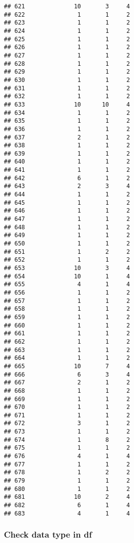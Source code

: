 \documentclass[
]{article}
\begin{document}
\begin{verbatim}
## 621              10       3     4
## 622               1       1     2
## 623               1       1     2
## 624               1       1     2
## 625               1       1     2
## 626               1       1     2
## 627               1       1     2
## 628               1       1     2
## 629               1       1     2
## 630               1       1     2
## 631               1       1     2
## 632               1       1     2
## 633              10      10     4
## 634               1       1     2
## 635               1       1     2
## 636               1       1     2
## 637               2       1     2
## 638               1       1     2
## 639               1       1     2
## 640               1       1     2
## 641               1       1     2
## 642               6       1     2
## 643               2       3     4
## 644               1       1     2
## 645               1       1     2
## 646               1       1     2
## 647               1       1     2
## 648               1       1     2
## 649               1       1     2
## 650               1       1     2
## 651               1       2     2
## 652               1       1     2
## 653              10       3     4
## 654              10       1     4
## 655               4       1     4
## 656               1       1     2
## 657               1       1     2
## 658               1       1     2
## 659               1       1     2
## 660               1       1     2
## 661               1       1     2
## 662               1       1     2
## 663               1       1     2
## 664               1       1     2
## 665              10       7     4
## 666               6       3     4
## 667               2       1     2
## 668               1       1     2
## 669               1       1     2
## 670               1       1     2
## 671               1       1     2
## 672               3       1     2
## 673               1       1     2
## 674               1       8     2
## 675               1       1     2
## 676               4       1     4
## 677               1       1     2
## 678               1       2     2
## 679               1       1     2
## 680               1       1     2
## 681              10       2     4
## 682               6       1     4
## 683               4       1     4
\end{verbatim}

\subsubsection{Check data type in df}\label{check-data-type-in-df}
\end{document}
